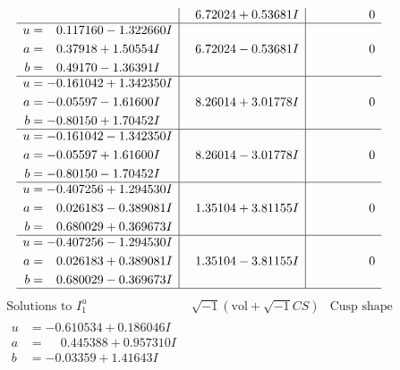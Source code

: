 \documentclass[1p]{elsarticle_modified}
\theoremstyle{definition}
\newcommand{\I}{\sqrt{-1}}
\begin{document}
$$\begin{array}{c|c|c}
 & \phantom{-}6.72024 + 0.53681 I & \phantom{-0.000000 } 0 \\ \hline\begin{aligned}
u &= \phantom{-}0.117160 - 1.322660 I \\
a &= \phantom{-}0.37918 + 1.50554 I \\
b &= \phantom{-}0.49170 - 1.36391 I\end{aligned}
 & \phantom{-}6.72024 - 0.53681 I & \phantom{-0.000000 } 0 \\ \hline\begin{aligned}
u &= -0.161042 + 1.342350 I \\
a &= -0.05597 - 1.61600 I \\
b &= -0.80150 + 1.70452 I\end{aligned}
 & \phantom{-}8.26014 + 3.01778 I & \phantom{-0.000000 } 0 \\ \hline\begin{aligned}
u &= -0.161042 - 1.342350 I \\
a &= -0.05597 + 1.61600 I \\
b &= -0.80150 - 1.70452 I\end{aligned}
 & \phantom{-}8.26014 - 3.01778 I & \phantom{-0.000000 } 0 \\ \hline\begin{aligned}
u &= -0.407256 + 1.294530 I \\
a &= \phantom{-}0.026183 - 0.389081 I \\
b &= \phantom{-}0.680029 + 0.369673 I\end{aligned}
 & \phantom{-}1.35104 + 3.81155 I & \phantom{-0.000000 } 0 \\ \hline\begin{aligned}
u &= -0.407256 - 1.294530 I \\
a &= \phantom{-}0.026183 + 0.389081 I \\
b &= \phantom{-}0.680029 - 0.369673 I\end{aligned}
 & \phantom{-}1.35104 - 3.81155 I & \phantom{-0.000000 } 0\\
 \hline 
 \end{array}$$\newpage$$\begin{array}{c|c|c}  
\text{Solutions to }I^u_{1}& \I (\text{vol} + \sqrt{-1}CS) & \text{Cusp shape}\\
 \hline 
\begin{aligned}
u &= -0.610534 + 0.186046 I \\
a &= \phantom{-}0.445388 + 0.957310 I \\
b &= -0.03359 + 1.41643 I\end{aligned}

\end{array}$$
\end{document}
